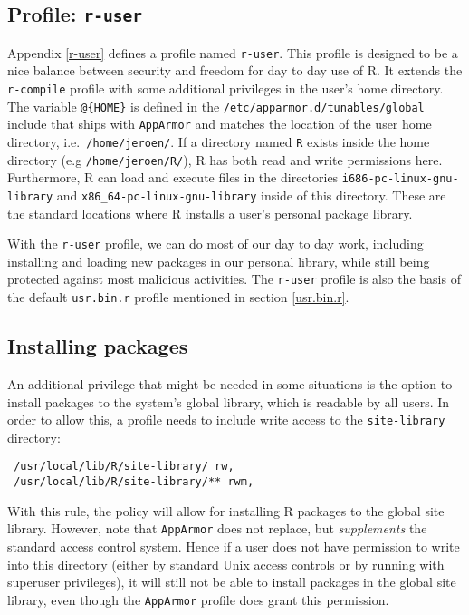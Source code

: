 \documentclass{jss}
\newcommand{\R}{\textsf{R}\xspace}
\newcommand{\AppArmor}{\texttt{AppArmor}\xspace}
\begin{document}
\subsection[Profile: r-user]{Profile: \texttt{r-user}}

Appendix \ref{r-user} defines a profile named \texttt{r-user}. This profile is
designed to be a nice balance between security and freedom for day to day use
of R. It extends the \texttt{r-compile} profile with some additional privileges
in the user's home directory. The variable \texttt{@\{HOME\}} is defined in the
\texttt{/etc/apparmor.d/tunables/global} include that ships with \AppArmor and
matches the location of the user home directory, i.e.\ \texttt{/home/jeroen/}.
If a directory named \texttt{R} exists inside the home directory 
(e.g \texttt{/home/jeroen/R/}), \R has both read and write permissions here.
Furthermore, \R can load and execute files in the directories
\texttt{i686-pc-linux-gnu-library} and \texttt{x86\_64-pc-linux-gnu-library}
inside of this directory. These are the standard locations where \R installs a
user's personal package library.

With the \texttt{r-user} profile, we can do most of our day to day work,
including installing and loading new packages in our personal library, while
still being protected against most malicious activities. The \texttt{r-user}
profile is also the basis of the default \texttt{usr.bin.r} profile mentioned
in section \ref{usr.bin.r}.

\subsection{Installing packages}

An additional privilege that might be needed in some situations is the option
to install packages to the system's global library, which is readable by all
users. In order to allow this, a profile needs to include write access to the
\texttt{site-library} directory:

\begin{verbatim}
 /usr/local/lib/R/site-library/ rw,
 /usr/local/lib/R/site-library/** rwm,
\end{verbatim}

With this rule, the policy will allow for installing \R packages to the global
site library. However, note that \AppArmor does not replace, but
\emph{supplements} the standard access control system. Hence if a user does not
have permission to write into this directory (either by standard Unix access
controls or by running with superuser privileges), it will still not be able to
install packages in the global site library, even though the \AppArmor profile
does grant this permission.
\end{document}
